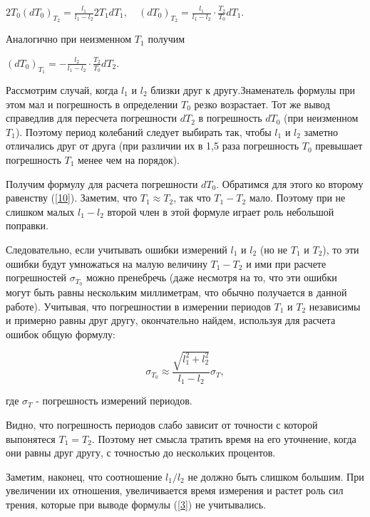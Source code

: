 \documentclass[12pt,a4paper]{article}
\begin{document}
\begin{center}
    $2T_0(dT_0)_{T_2} = \frac{l_1}{l_1-l_2}2T_1dT_1, \quad (dT_0)_{T_2} = \frac{l_1}{l_1-l_2}\cdot\frac{T_2}{T_0}dT_1.$
\end{center}

Аналогично при неизменном $T_1$ получим

\begin{center}
    $(dT_0)_{T_1} = -\frac{l_2}{l_1-l_2}\cdot\frac{T_2}{T_0}dT_2.$
\end{center}

Рассмотрим случай, когда $l_1$ и $l_2$ близки друг к другу.Знаменатель формулы при этом мал и погрешность в определении $T_0$ резко возрастает. Тот же вывод справедлив для пересчета погрешности $dT_2$ в погрешность $dT_0$ (при неизменном $T_1$). Поэтому период колебаний следует выбирать так, чтобы $l_1$ и $l_2$ заметно отличались друг от друга (при различии их в 1,5 раза погрешность $T_0$ превышает погрешность $T_1$ менее чем на порядок).

Получим формулу для расчета погрешности $dT_0$. Обратимся для этого ко второму равенству (\ref{10}). Заметим, что $T_1\approx T_2$, так что $T_1 - T_2$ мало. Поэтому при не слишком малых $l_1-l_2$ второй член в этой формуле играет роль небольшой поправки.

Следовательно, если учитывать ошибки измерений $l_1$ и $l_2$ (но не $T_1$ и $T_2$), то эти ошибки будут умножаться на малую величину $T_1 - T_2$ и ими при расчете погрешностей $\sigma_{T_0}$ можно пренебречь (даже несмотря на то, что эти ошибки могут быть равны нескольким миллиметрам, что обычно получается в данной работе). Учитывая, что погрешностии в измерении периодов $T_1$ и $T_2$ независимы и примерно равны друг другу, окончательно найдем, используя для расчета ошибок общую формулу:

\begin{equation}\label{13}
    \sigma_{T_0}\approx\frac{\sqrt{l_1^2+l_2^2}}{l_1-l_2}\sigma_T,
\end{equation}

где $\sigma_T$ - погрешность измерений периодов.

Видно, что погрешность периодов слабо зависит от точности с которой выпонятеся $T_1 = T_2$. Поэтому нет смысла тратить время на его уточнение, когда они равны друг другу, с точностью до нескольких процентов.

Заметим, наконец, что соотношение $l_1/l_2$ не должно быть слишком большим. При увеличении их отношения, увеличивается время измерения и растет роль сил трения, которые при выводе формулы (\ref{3}) не учитывались.
\end{document}
